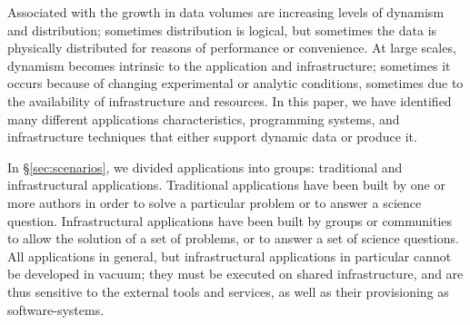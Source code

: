 Associated with the growth in data volumes are increasing levels of dynamism and
distribution; sometimes distribution is logical, but sometimes the data is
physically distributed for reasons of performance or convenience. At large
scales, dynamism becomes intrinsic to the application and infrastructure;
sometimes it occurs because of changing experimental or analytic conditions,
sometimes due to the availability of infrastructure and resources. In this
paper, we have identified many different applications characteristics,
programming systems, and infrastructure techniques that either support dynamic
data or produce it.





In \S\ref{sec:scenarios}, we divided applications into groups: traditional and
infrastructural applications.  Traditional applications have been built by one
or more authors in order to solve a particular problem or to answer a science
question.  Infrastructural applications have been built by groups or communities
to allow the solution of a set of problems, or to answer a set of science
questions. All applications in general, but infrastructural applications in
particular cannot be developed in vacuum; they must be executed on shared
infrastructure, and are thus sensitive to the external tools and services, as
well as their provisioning as software-systems.

